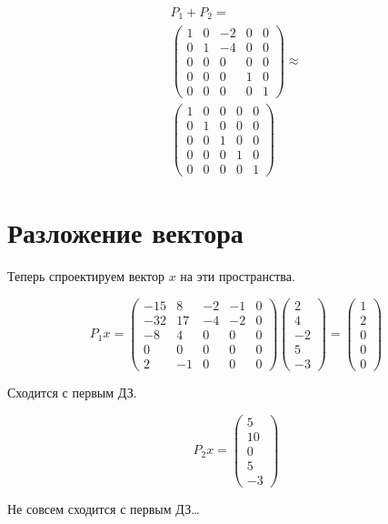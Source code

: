 \documentclass[12pt, a4paper]{article}
\begin{document}
    \begin{multline}
        P_1 + P_2 = \\
        \left(\begin{matrix}
            1 & 0 & -2 & 0 & 0 \\
            0 & 1 & -4 & 0 & 0 \\
            0 & 0 & 0 & 0 & 0 \\
            0 & 0 & 0 & 1 & 0 \\
            0 & 0 & 0 & 0 & 1
        \end{matrix}\right) \approx \\
        \left(\begin{matrix}
            1 & 0 & 0 & 0 & 0 \\
            0 & 1 & 0 & 0 & 0 \\
            0 & 0 & 1 & 0 & 0 \\
            0 & 0 & 0 & 1 & 0 \\
            0 & 0 & 0 & 0 & 1
        \end{matrix}\right) 
    \end{multline}

    \section{Разложение вектора}

    Теперь спроектируем вектор $x$ на эти пространства.

    \begin{equation}
        P_1 x = \left(\begin{matrix}
            -15 & 8 & -2 & -1 & 0 \\
            -32 & 17 & -4 & -2 & 0 \\
            -8 & 4 & 0 & 0 & 0 \\
            0 & 0 & 0 & 0 & 0 \\
            2 & -1 & 0 & 0 & 0
        \end{matrix}\right) \left(\begin{matrix}
            2 \\
            4 \\
            -2 \\
            5 \\
            -3
        \end{matrix}\right) = \left(\begin{matrix}
            1 \\
            2 \\
            0 \\
            0 \\
            0
        \end{matrix}\right)
    \end{equation}

    Сходится с первым ДЗ.

    \begin{equation}
        P_2 x = \left(\begin{matrix}
            5 \\
            10 \\
            0 \\
            5 \\
            -3
        \end{matrix}\right)
    \end{equation}

    Не совсем сходится с первым ДЗ…
\end{document}
